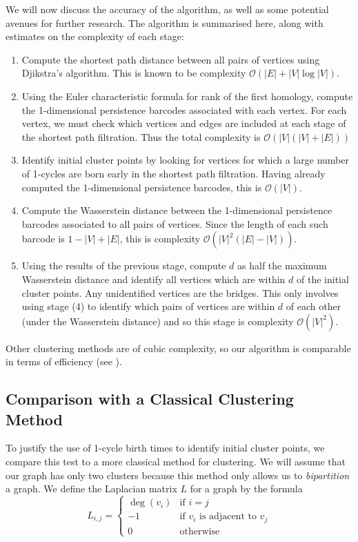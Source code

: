 \documentclass[12pt,a4paper]{amsart}
\numberwithin{equation}{section}
\theoremstyle{plain}
\theoremstyle{definition}
\begin{document}
We will now discuss the accuracy of the algorithm, as well as some potential avenues for further research. The algorithm is summarised here, along with estimates on the complexity of each stage:
\begin{enumerate}
	\item Compute the shortest path distance between all pairs of vertices using Djikstra's algorithm. This is known to be complexity $\mathcal{O}(|E|+|V|\log |V|)$.
	\item Using the Euler characteristic formula for rank of the first homology, compute the 1-dimensional persistence barcodes associated with each vertex. For each vertex, we must check which vertices and edges are included at each stage of the shortest path filtration. Thus the total complexity is $\mathcal{O}(|V|(|V|+|E|))$ 
	\item Identify initial cluster points by looking for vertices for which a large number of 1-cycles are born early in the shortest path filtration. Having already computed the 1-dimensional persistence barcodes, this is $\mathcal{O}(|V|)$.
	\item Compute the Wasserstein distance between the 1-dimensional persistence barcodes associated to all pairs of vertices. Since the length of each such barcode is $1-|V|+|E|$, this is complexity $\mathcal{O}(|V|^2(|E|-|V|))$.
	\item Using the results of the previous stage, compute $d$ as half the maximum Wasserstein distance and identify all vertices which are within $d$ of the initial cluster points. Any unidentified vertices are the bridges. This only involves using stage (4) to identify which pairs of vertices are within $d$ of each other (under the Wasserstein distance) and so this stage is complexity $\mathcal{O}(|V|^2)$.
\end{enumerate}

Other clustering methods are of cubic complexity, so our algorithm is comparable in terms of efficiency (see \cite{spectral}).

\newpage

\subsection*{Comparison with a Classical Clustering Method} To justify the use of 1-cycle birth times to identify initial cluster points, we compare this test to a more classical method for clustering. We will assume that our graph has only two clusters because this method only allows us to \textit{bipartition} a graph. We define the Laplacian matrix $L$ for a graph by the formula
\[ L_{i,j} = \begin{cases} \deg(v_i) & \mbox{if $i=j$} \\ -1 & \mbox{if $v_i$ is adjacent to $v_j$} \\ 0 & \mbox{otherwise} \end{cases} \]
\end{document}
